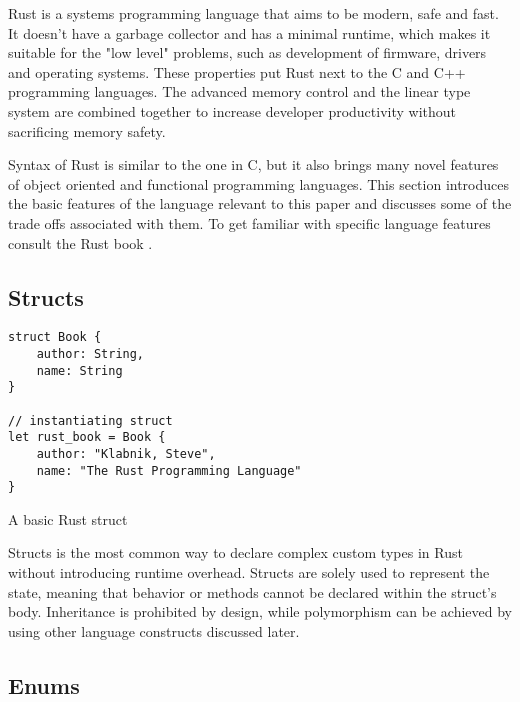 Rust is a systems programming language that aims to be modern, safe and fast. It doesn't have a garbage collector and has a minimal runtime, which makes it suitable for the "low level" problems, such as development of firmware, drivers and operating systems. These properties put Rust next to the C and C++ programming languages. The advanced memory control and the linear type system are combined together to increase developer productivity without sacrificing memory safety.

Syntax of Rust is similar to the one in C, but it also brings many novel features of object oriented and functional programming languages. This section introduces the basic features of the language relevant to this paper and discusses some of the trade offs associated with them. To get familiar with specific language features consult the Rust book \cite{rust-book-2e}.

\subsection{Structs}

\begin{listing}[ht!]
\begin{verbatim}
struct Book {
    author: String, 
    name: String
}

// instantiating struct
let rust_book = Book { 
    author: "Klabnik, Steve", 
    name: "The Rust Programming Language"
}
\end{verbatim}
\caption{A basic Rust struct}
\label{lst:struct}
\end{listing}

Structs is the most common way to declare complex custom types in Rust without introducing runtime overhead. Structs are solely used to represent the state, meaning that behavior or methods cannot be declared within the struct's body. Inheritance is prohibited by design, while polymorphism can be achieved by using other language constructs discussed later. 

\subsection{Enums}



